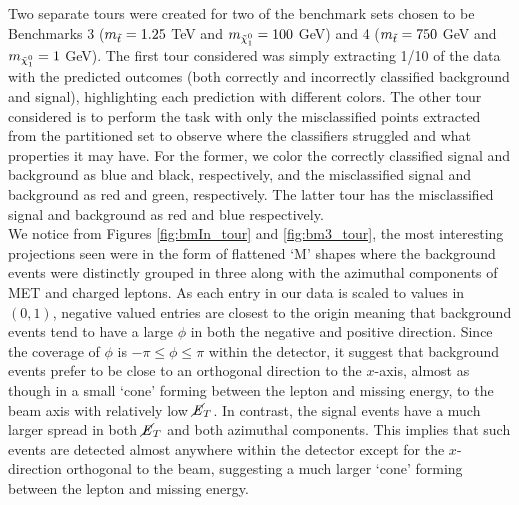 Two separate tours were created for two of the benchmark sets chosen to be Benchmarks 3 ($m_{\Tilde{t}} = 1.25$ TeV and $m_{\Tilde{\chi}_1^0} = 100$ GeV) and 4 ($m_{\Tilde{t}} = 750$ GeV and $m_{\Tilde{\chi}_1^0} = 1$ GeV). The first tour considered was simply extracting 1/10 of the data with the predicted outcomes (both correctly and incorrectly classified background and signal), highlighting each prediction with different colors. The other tour considered is to perform the task with only the misclassified points extracted from the partitioned set to observe where the classifiers struggled and what properties it may have. For the former, we color the correctly classified signal and background as blue and black, respectively, and the misclassified signal and background as red and green, respectively. The latter tour has the misclassified signal and background as red and blue respectively. \\

We notice from Figures \ref{fig:bmIn_tour} and \ref{fig:bm3_tour}, the most interesting projections seen were in the form of flattened `M' shapes where the background events were distinctly grouped in three along with the azimuthal components of MET and charged leptons. As each entry in our data is scaled to values in $(0,1)$, negative valued entries are closest to the origin meaning that background events tend to have a large $\phi$ in both the negative and positive direction. Since the coverage of $\phi$ is $-\pi \le \phi \le \pi$ within the detector, it suggest that background events prefer to be close to an orthogonal direction to the $x$-axis, almost as though in a small `cone' forming between the lepton and missing energy, to the beam axis with relatively low $\cancel{\it{E}}_{T}$. In contrast, the signal events have a much larger spread in both $\cancel{\it{E}}_{T}$ and both azimuthal components. This implies that such events are detected almost anywhere within the detector except for the $x$-direction orthogonal to the beam, suggesting a much larger `cone' forming between the lepton and missing energy. \\

